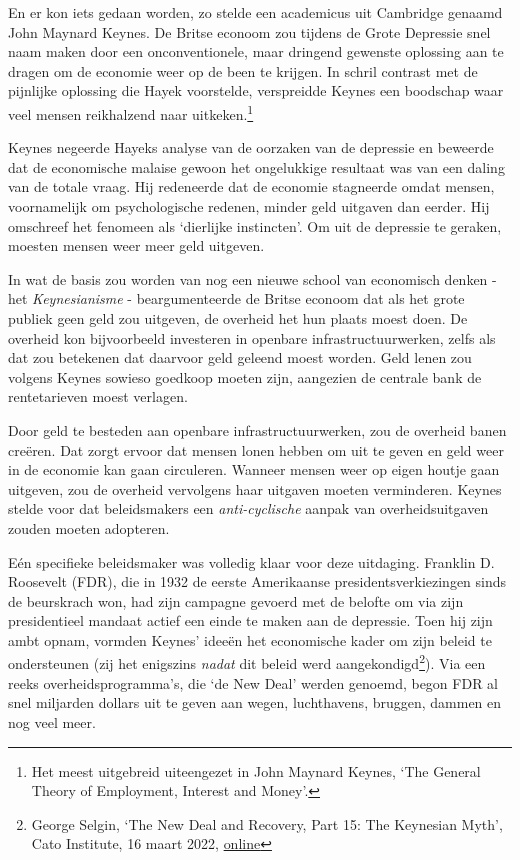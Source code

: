 \documentclass[smalldemyvopaper,11pt,twoside,onecolumn,openright,extrafontsizes,hidelinks]{memoir}
\begin{document}
En er kon iets gedaan worden, zo stelde een academicus uit Cambridge
genaamd John Maynard Keynes. De Britse econoom zou tijdens de Grote
Depressie snel naam maken door een onconventionele, maar dringend
gewenste oplossing aan te dragen om de economie weer op de been te
krijgen. In schril contrast met de pijnlijke oplossing die Hayek
voorstelde, verspreidde Keynes een boodschap waar veel mensen
reikhalzend naar uitkeken.\footnote{Het meest uitgebreid uiteengezet in
  John Maynard Keynes, `The General Theory of Employment, Interest and
  Money'.}

Keynes negeerde Hayeks analyse van de oorzaken van de depressie en
beweerde dat de economische malaise gewoon het ongelukkige resultaat was
van een daling van de totale vraag. Hij redeneerde dat de economie
stagneerde omdat mensen, voornamelijk om psychologische redenen, minder
geld uitgaven dan eerder. Hij omschreef het fenomeen als `dierlijke
instincten'. Om uit de depressie te geraken, moesten mensen weer meer
geld uitgeven.

In wat de basis zou worden van nog een nieuwe school van economisch
denken - het \emph{Keynesianisme} - beargumenteerde de Britse econoom
dat als het grote publiek geen geld zou uitgeven, de overheid het hun
plaats moest doen. De overheid kon bijvoorbeeld investeren in openbare
infrastructuurwerken, zelfs als dat zou betekenen dat daarvoor geld
geleend moest worden. Geld lenen zou volgens Keynes sowieso goedkoop
moeten zijn, aangezien de centrale bank de rentetarieven moest verlagen.

Door geld te besteden aan openbare infrastructuurwerken, zou de overheid
banen creëren. Dat zorgt ervoor dat mensen lonen hebben om uit te geven
en geld weer in de economie kan gaan circuleren. Wanneer mensen weer op
eigen houtje gaan uitgeven, zou de overheid vervolgens haar uitgaven
moeten verminderen. Keynes stelde voor dat beleidsmakers een
\emph{anti-cyclische} aanpak van overheidsuitgaven zouden moeten
adopteren.

Eén specifieke beleidsmaker was volledig klaar voor deze uitdaging.
Franklin D. Roosevelt (FDR), die in 1932 de eerste Amerikaanse
presidentsverkiezingen sinds de beurskrach won, had zijn campagne
gevoerd met de belofte om via zijn presidentieel mandaat actief een
einde te maken aan de depressie. Toen hij zijn ambt opnam, vormden
Keynes' ideeën het economische kader om zijn beleid te ondersteunen (zij
het enigszins \emph{nadat} dit beleid werd aangekondigd\footnote{\hspace{0pt}George
  Selgin, `The New Deal and Recovery, Part 15: The Keynesian Myth', Cato
  Institute, 16 maart 2022,
  \href{https://www.cato.org/blog/new-deal-recovery-part-15-keynesian-myth.}{online}}).
Via een reeks overheidsprogramma's, die `de New Deal' werden genoemd,
begon FDR al snel miljarden dollars uit te geven aan wegen, luchthavens,
bruggen, dammen en nog veel meer.
\end{document}
